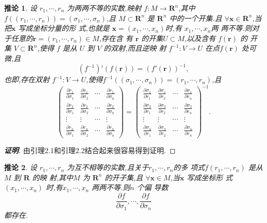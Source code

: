 \documentclass[a4paper]{article}
\newtheorem{corollary}{推论}[section]
\newcommand{\pa}{\partial} \newcommand{\Om}{\Omega}
\begin{document}
      \begin{corollary}
        设 $r_1,\cdots,r_n$ 为两两不等的实数,映射 $f:M\to
        \mathbf{R}^n$,其中
        $f((r_1,\cdots,r_n))=(\sigma_1,\cdots,\sigma_n)$,且 $M\subset
        \mathbf{R}^n$ 是 $\mathbf{R}^n$ 中的一个开集.且 $\forall
        \mathbf{x}\in \mathbf{R}^n$,当把$\mathbf{x}$ 写成坐标分量的形
        式,也就是 $\mathbf{x}=(x_1,\cdots,x_n)$时,有 $x_1,\cdots,x_n$两
        两不等.则对于任意的$\mathbf{r}=(r_1,\cdots,r_n)\in M$,存在含
        有 $\mathbf{r}$ 的开集$U\subset M$,以及含有 $f(\mathbf{r})$ 的
        开集 $V\subset \mathbf{R}^n$,使得 $f$ 是从 $U$ 到 $V$ 的双射,而且逆映
        射 $f^{-1}:V\to U$ 在点$f(\mathbf{r})$ 处可微,且
$$
(f^{-1})'(f(\mathbf{r}))=(f'(\mathbf{r}))^{-1},
$$
也即,存在双射 $f^{-1}:V\to
U$,使得$f^{-1}((\sigma_1,\cdots,\sigma_n))=(r_1,\cdots,r_n)$,且
$$
\begin{pmatrix}
  \frac{\pa r_1}{\pa \sigma_1}&\frac{\pa r_1}{\pa
    \sigma_2}&\cdots&\frac{\pa
    r_1}{\pa \sigma_n}\\
  \frac{\pa r_2}{\pa \sigma_1}&\frac{\pa r_2}{\pa
    \sigma_2}&\cdots&\frac{\pa
    r_2}{\pa \sigma_n}\\
  \vdots&\vdots&\cdots&\vdots\\
  \frac{\pa r_n}{\pa \sigma_1}&\frac{\pa r_n}{\pa
    \sigma_2}&\cdots&\frac{\pa r_n}{\pa \sigma_n}
\end{pmatrix}=
\begin{pmatrix}
  \frac{\pa \sigma_1}{\pa r_1}&\frac{\pa\sigma_1}{\pa
    r_2}&\cdots&\frac{\pa
    \sigma_1}{\pa r_n}\\
  \frac{\pa \sigma_2}{\pa r_1}&\frac{\pa \sigma_2}{\pa
    r_2}&\cdots&\frac{\pa
    \sigma_2}{\pa r_n}\\
  \vdots&\vdots&\cdots&\vdots\\
  \frac{\pa \sigma_n}{\pa r_1}&\frac{\pa\sigma_n}{\pa
    r_2}&\cdots&\frac{\pa \sigma_n}{\pa r_n}
\end{pmatrix}^{-1}.
$$
\end{corollary}
\begin{proof}[\bf{证明}]
  由引理2.1和引理2.2结合起来很容易得到证明.
\end{proof}

      \begin{corollary}
        设 $r_1,\cdots,r_n$ 为互不相等的实数,且关于$r_1,\cdots,r_n$的多
        项式$f(r_1,\cdots,r_n)$ 是从 $M$ 到 $\mathbf{R}$ 的映
        射,其中$M$ 为 $\mathbf{R}^n$ 的开子集,且 $\forall
        \mathbf{x}\in M$,当$\mathbf{x}$ 写成坐标形
        式 $(x_1,\cdots,x_n)$ 时,有$x_1,\cdots,x_n$ 两两不等.则$n$ 个偏
        导数
$$
\frac{\pa f}{\pa \sigma_1},\cdots,\frac{\pa f}{\pa \sigma_n}
$$
都存在.
\end{corollary}
\end{document}
